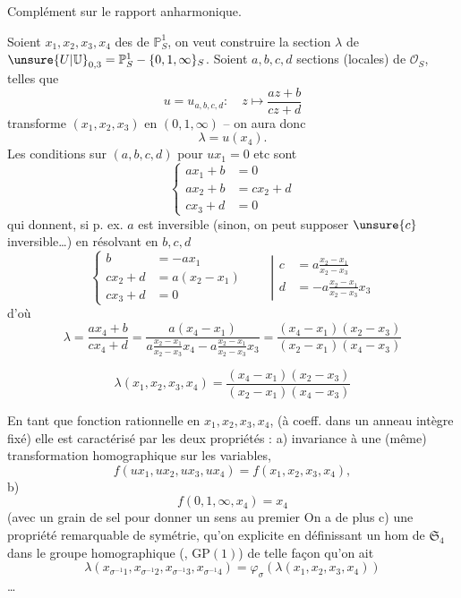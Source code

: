 Complément sur le rapport anharmonique.

Soient $x_1,x_2,x_3,x_4$ des  de
$\mathbb P^1_S$, on veut construire la section  $\lambda$
de $\unsure{U|\mathbb U}_{0,3}=\mathbb P^1_S-\{0,1,\infty\}_S$.
Soient $a,b,c,d$ sections
(locales) de $\mathcal O_S$,  telles que
\[
u=u_{a,b,c,d}:\quad z\longmapsto\frac{az+b}{cz+d}
\tag{77}
\]
transforme $(x_1,x_2,x_3)$ en $(0,1,\infty)$ -- on
aura donc
\[
\lambda=u(x_4).
\tag{78}
\]
Les conditions sur  $(a,b,c,d)$ pour $ux_1=0$ etc sont
\[
\left\{\begin{aligned}
ax_1+b&=0\\
ax_2+b&=cx_2+d\\
cx_3+d&=0
\end{aligned}\right.
\]
qui donnent, si p. ex. $a$ est inversible (sinon, on
peut supposer $\unsure{c}$ inversible\ldots) en résolvant en $b,c,d$
\[
\left\{\begin{aligned}
b&=-ax_1\\
cx_2+d&=a(x_2-x_1)\\
cx_3+d&=0
\end{aligned}\right.
\qquad\left|\begin{aligned}
c&=a\frac{x_2-x_1}{x_2-x_3}\\
d&=-a\frac{x_2-x_1}{x_2-x_3}x_3
\end{aligned}\right.
\]
d'où
\[
\lambda=\frac{ax_4+b}{cx_4+d}
=\frac{a(x_4-x_1)}{a\frac{x_2-x_1}{x_2-x_3}x_4-a\frac{x_2-x_1}{x_2-x_3}x_3}
=\frac{(x_4-x_1)(x_2-x_3)}{(x_2-x_1)(x_4-x_3)}
\]

\[
\lambda(x_1,x_2,x_3,x_4)=\frac{(x_4-x_1)(x_2-x_3)}{(x_2-x_1)(x_4-x_3)}
\tag{79}
\]

En tant que fonction rationnelle en $x_1,x_2,x_3,x_4$,
(à coeff. dans un anneau intègre fixé) elle
est caractérisé par les deux propriétés : a) invariance  à une (même) transformation
homographique sur les variables,  
\[
f(ux_1,ux_2,ux_3,ux_4)=f(x_1,x_2,x_3,x_4),
\]
 b)
\[
f(0,1,\infty,x_4)=x_4
\]
(avec un grain de sel pour donner un
sens au premier  On a de plus
c) une propriété remarquable de symétrie,
qu'on  explicite en définissant un hom
de $\mathfrak S_4$ dans le groupe homographique
(, $\mathrm{GP}(1)$)
de telle façon qu'on ait
\[
\lambda(x_{\sigma^{-1}1},x_{\sigma^{-1}2},x_{\sigma^{-1}3},x_{\sigma^{-1}4})
=\varphi_\sigma(\lambda(x_1,x_2,x_3,x_4))
\tag{80}
\]
\ldots
